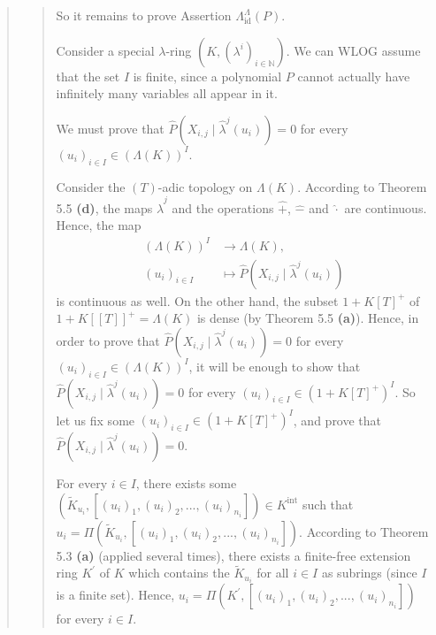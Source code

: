 \documentclass[12pt,final,notitlepage,onecolumn,german]{article}%
\begin{document}
\begin{quote}
\begin{quote}
So it remains to prove Assertion $\Lambda_{\operatorname*{id}}^{\Lambda
}\left(  P\right)  $.

Consider a special $\lambda$-ring $\left(  K,\left(  \lambda^{i}\right)
_{i\in\mathbb{N}}\right)  $. We can WLOG assume that the set $I$ is finite,
since a polynomial $P$ cannot actually have infinitely many variables all
appear in it.

We must prove that $\widehat{P}\left(  X_{i,j}\mid\widehat{\lambda}^{j}\left(
u_{i}\right)  \right)  =0$ for every $\left(  u_{i}\right)  _{i\in I}%
\in\left(  \Lambda\left(  K\right)  \right)  ^{I}$.

Consider the $\left(  T\right)  $-adic topology on $\Lambda\left(  K\right)
$. According to Theorem 5.5 \textbf{(d)}, the maps $\widehat{\lambda}^{j}$ and
the operations $\widehat{+}$, $\widehat{-}$ and $\widehat{\cdot}$ are
continuous. Hence, the map%
\begin{align*}
\left(  \Lambda\left(  K\right)  \right)  ^{I}  &  \rightarrow\Lambda\left(
K\right)  ,\\
\left(  u_{i}\right)  _{i\in I}  &  \mapsto\widehat{P}\left(  X_{i,j}%
\mid\widehat{\lambda}^{j}\left(  u_{i}\right)  \right)
\end{align*}
is continuous as well. On the other hand, the subset $1+K\left[  T\right]
^{+}$ of $1+K\left[  \left[  T\right]  \right]  ^{+}=\Lambda\left(  K\right)
$ is dense (by Theorem 5.5 \textbf{(a)}). Hence, in order to prove that
$\widehat{P}\left(  X_{i,j}\mid\widehat{\lambda}^{j}\left(  u_{i}\right)
\right)  =0$ for every $\left(  u_{i}\right)  _{i\in I}\in\left(
\Lambda\left(  K\right)  \right)  ^{I}$, it will be enough to show that
$\widehat{P}\left(  X_{i,j}\mid\widehat{\lambda}^{j}\left(  u_{i}\right)
\right)  =0$ for every $\left(  u_{i}\right)  _{i\in I}\in\left(  1+K\left[
T\right]  ^{+}\right)  ^{I}$. So let us fix some $\left(  u_{i}\right)  _{i\in
I}\in\left(  1+K\left[  T\right]  ^{+}\right)  ^{I}$, and prove that
$\widehat{P}\left(  X_{i,j}\mid\widehat{\lambda}^{j}\left(  u_{i}\right)
\right)  =0$.

For every $i\in I$, there exists some $\left(  \widetilde{K}_{u_{i}},\left[
\left(  u_{i}\right)  _{1},\left(  u_{i}\right)  _{2},...,\left(
u_{i}\right)  _{n_{i}}\right]  \right)  \in K^{\operatorname*{int}}$ such that
$u_{i}=\Pi\left(  \widetilde{K}_{u_{i}},\left[  \left(  u_{i}\right)
_{1},\left(  u_{i}\right)  _{2},...,\left(  u_{i}\right)  _{n_{i}}\right]
\right)  $. According to Theorem 5.3 \textbf{(a)} (applied several times),
there exists a finite-free extension ring $K^{\prime}$ of $K$ which contains
the $\widetilde{K}_{u_{i}}$ for all $i\in I$ as subrings (since $I$ is a
finite set). Hence, $u_{i}=\Pi\left(  K^{\prime},\left[  \left(  u_{i}\right)
_{1},\left(  u_{i}\right)  _{2},...,\left(  u_{i}\right)  _{n_{i}}\right]
\right)  $ for every $i\in I$.


\end{quote}
\end{quote}
\end{document}
